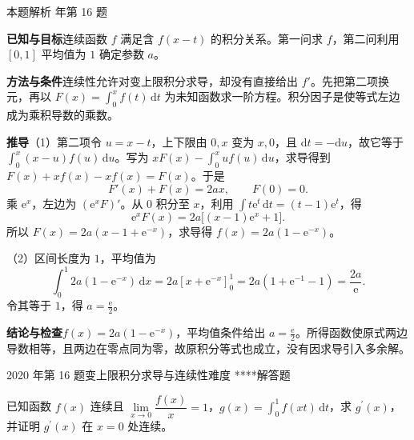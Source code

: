 \documentclass[UTF8,zihao=-4,fontset=fandol]{ctexart}
\renewcommand{\lim}{\operatorname*{lim}\limits}
\newcounter{BankQuestion}
\newcommand{\QuestionPage}[7]{%
  \stepcounter{BankQuestion}%
  \par\noindent\begin{minipage}{\linewidth}
  \raggedright
  {\small\textcolor{black!60}{#3\quad #5\quad 难度 #7}\hfill\textcolor{accent}{#2}}\par\smallskip}
\newcommand{\QuestionEnd}{\end{minipage}\par\medskip}
\newcommand{\QuestionPage}[7]{%
  \clearpage
  \stepcounter{BankQuestion}%
  {\small\textcolor{accent}{#1\hfill #2}}\par\medskip
  {\small\textcolor{black!60}{#3\quad #5\quad 难度 #7\hfill \arabic{BankQuestion} / 234}}\par\vspace{9bp}}
\newcommand{\QuestionEnd}{}
\newenvironment{QuestionSolution}[1]{%
  \clearpage
  {\small\textcolor{black!60}{本题解析\quad #1}}\par\medskip
}{\par\clearpage}
\begin{document}
\begin{QuestionSolution}{2018 年第 16 题}
\textbf{已知与目标}\quad 连续函数 \(f\) 满足含 \(f(x-t)\) 的积分关系。第一问求 \(f\)，第二问利用 \([0,1]\) 平均值为 \(1\) 确定参数 \(a\)。

\textbf{方法与条件}\quad 连续性允许对变上限积分求导，却没有直接给出 \(f'\)。先把第二项换元，再以 \(F(x)=\int_0^xf(t)\,\mathrm{d}t\) 为未知函数求一阶方程。积分因子是使等式左边成为乘积导数的乘数。

\textbf{推导}\quad （1）第二项令 \(u=x-t\)，上下限由 \(0,x\) 变为 \(x,0\)，且 \(\mathrm{d}t=-\mathrm{d}u\)，故它等于 \(\int_0^x(x-u)f(u)\,\mathrm{d}u\)。写为 \(xF(x)-\int_0^xu f(u)\,\mathrm{d}u\)，求导得到 \(F(x)+xf(x)-xf(x)=F(x)\)。于是
\[
F'(x)+F(x)=2ax,\qquad F(0)=0.
\]
乘 \(\mathrm{e}^x\)，左边为 \((\mathrm{e}^xF)'\)。从 \(0\) 积分至 \(x\)，利用 \(\int t\mathrm{e}^t\,\mathrm{d}t=(t-1)\mathrm{e}^t\)，得
\[
\mathrm{e}^xF(x)=2a\bigl[(x-1)\mathrm{e}^x+1\bigr].
\]
所以 \(F(x)=2a(x-1+\mathrm{e}^{-x})\)，求导得 \(f(x)=2a(1-\mathrm{e}^{-x})\)。

（2）区间长度为 \(1\)，平均值为
\[
\int_0^1 2a(1-\mathrm{e}^{-x})\,\mathrm{d}x
=2a[x+\mathrm{e}^{-x}]_0^1
=2a(1+\mathrm{e}^{-1}-1)=\frac{2a}{\mathrm{e}}.
\]
令其等于 \(1\)，得 \(a=\frac{\mathrm{e}}{2}\)。

\textbf{结论与检查}\quad \(\boxed{f(x)=2a(1-\mathrm{e}^{-x})}\)，平均值条件给出 \(\boxed{a=\frac{\mathrm{e}}{2}}\)。所得函数使原式两边导数相等，且两边在零点同为零，故原积分等式也成立，没有因求导引入多余解。
\end{QuestionSolution}

\QuestionPage{3.2 微积分基本公式与基本定理}{解答题}{2020 年第 16 题}{2}{变上限积分求导与连续性}{150 / 234}{****}
已知函数 \(f\left( x \right)\) 连续且 \(\lim_{x\to 0}{\dfrac{f\left( x \right)}{x}} = 1\)，\(g\left( x \right)=\int_{0}^{1}{f\left( xt \right) \,\mathrm{d} t}\)，求 \(g^{\prime}\left( x \right)\)，并证明 \(g^{\prime}\left( x \right)\) 在 \(x=0\) 处连续。
\QuestionEnd
\end{document}
